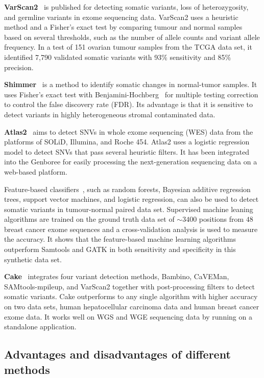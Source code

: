 \documentclass[a4,center,fleqn]{NAR}
\begin{document}
\textbf{VarScan2}~\citep{Koboldt2012} is published for detecting somatic variants, loss of heterozygosity, and germline variants in exome sequencing data.
VarScan2 uses a heuristic method and a Fisher's exact test by comparing tumour and normal samples based on several thresholds, such as the number of allele counts and variant allele frequency.
In a test of 151 ovarian tumour samples from the TCGA data set, it identified 7,790 validated somatic variants with 93\% sensitivity and 85\% precision.

\textbf{Shimmer}~\citep{Hansen2013} is a method to identify somatic changes in normal-tumor samples.
It uses Fisher's exact test with Benjamini-Hochberg~\citep{benjamini1995controlling} for multiple testing correction to control the false discovery rate (FDR).
Its advantage is that it is sensitive to detect variants in highly heterogeneous stromal contaminated data.

\textbf{Atlas2}~\citep{challis2012integrative} aims to detect SNVs in whole exome sequencing (WES) data from the platforms of SOLiD, Illumina, and Roche 454.
Atlas2 uses a logistic regression model to detect SNVs that pass several heuristic filters.
It has been integrated into the Genboree for easily processing the next-generation sequencing data on a web-based platform.

Feature-based classifiers~\citep{Ding2012}, such as random forests, Bayesian additive regression trees, support vector machines, and logistic regression, can also be used to detect somatic variants in tumour-normal paired data set.
Supervised machine leaning algorithms are trained on the ground truth data set of $\sim 3400$ positions from $48$ breast cancer exome sequences and a cross-validation analysis is used to measure the accuracy.
It shows that the feature-based machine learning algorithms outperform Samtools and GATK in both sensitivity and specificity in this synthetic data set.

\textbf{Cake}~\citep{rashid2013cake} integrates four variant detection methods, Bambino, CaVEMan, SAMtools-mpileup, and VarScan2 together with post-processing filters to detect somatic variants.
Cake outperforms to any single algorithm with higher accuracy on two data sets, human hepatocellular carcinoma data and human breast cancer exome data.
It works well on WGS and WGE sequencing data by running on a standalone application.


\subsection{Advantages and disadvantages of different methods}
\end{document}

